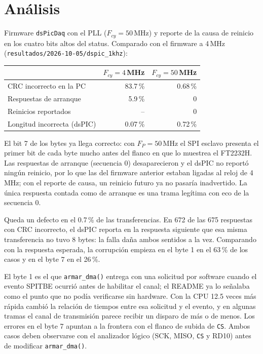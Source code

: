 \section{Análisis}

Firmware \texttt{dsPicDaq} con el PLL ($F_{cy} = 50$\,MHz) y reporte de la
causa de reinicio en los cuatro bits altos del status. Comparado con el
firmware a 4\,MHz (\texttt{resultados/2026-10-05/dspic\_1khz}):

\begin{table}[H]
\centering
\begin{tabular}{@{}lrr@{}}
\toprule
 & $F_{cy} = 4$\,MHz & $F_{cy} = 50$\,MHz \\
\midrule
CRC incorrecto en la PC        & 83.7\,\% & 0.68\,\% \\
Respuestas de arranque         & 5.9\,\%  & 0 \\
Reinicios reportados           & --       & 0 \\
Longitud incorrecta (dsPIC)    & 0.07\,\% & 0.72\,\% \\
\bottomrule
\end{tabular}
\end{table}

El bit 7 de los bytes ya llega correcto: con $F_P = 50$\,MHz el SPI esclavo
presenta el primer bit de cada byte mucho antes del flanco en que lo muestrea
el FT2232H. Las respuestas de arranque (secuencia 0) desaparecieron y el
dsPIC no reportó ningún reinicio, por lo que las del firmware anterior
estaban ligadas al reloj de 4\,MHz; con el reporte de causa, un reinicio
futuro ya no pasaría inadvertido. La única respuesta contada como de
arranque es una trama legítima con eco de la secuencia 0.

Queda un defecto en el 0.7\,\% de las transferencias. En 672 de las 675
respuestas con CRC incorrecto, el dsPIC reporta en la respuesta siguiente
que esa misma transferencia no tuvo 8 bytes: la falla daña ambos sentidos a
la vez. Comparando con la respuesta esperada, la corrupción empieza en el
byte 1 en el 63\,\% de los casos y en el byte 7 en el 26\,\%.

El byte 1 es el que \texttt{armar\_dma()} entrega con una solicitud por
software cuando el evento SPITBE ocurrió antes de habilitar el canal; el
README ya lo señalaba como el punto que no podía verificarse sin hardware.
Con la CPU 12.5 veces más rápida cambió la relación de tiempos entre esa
solicitud y el evento, y en algunas tramas el canal de transmisión parece
recibir un disparo de más o de menos. Los errores en el byte 7 apuntan a la
frontera con el flanco de subida de \texttt{CS}. Ambos casos deben
observarse con el analizador lógico (SCK, MISO, \texttt{CS} y RD10) antes de
modificar \texttt{armar\_dma()}.
